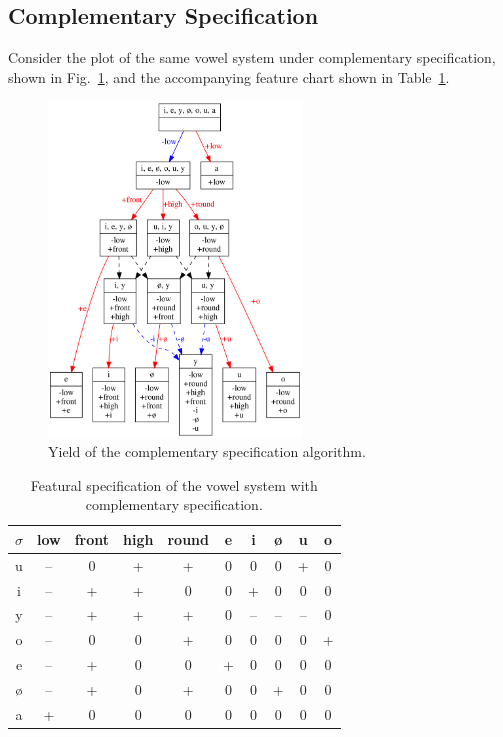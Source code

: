 \documentclass[12pt, oneside]{article}   	%
\begin{document}
\subsection{Complementary Specification}

Consider the plot of the same vowel system under complementary specification, shown in Fig.~\ref{fig:vowel_inventory_complementary}, and the accompanying feature chart shown in Table~\ref{table:vowel_inventory_complementary}.

\begin{figure}[htb!]
	\centering
	\includegraphics[width=0.6\textwidth]{vowel_inventory_complementary.png}
	\caption{Yield of the complementary specification algorithm.}
	\label{fig:vowel_inventory_complementary}
\end{figure}

\begin{table}[htb!]
	\centering
	\begin{tabular} {|c||c|c|c|c|c|c|c|c|c|}
		\hline
		$\sigma$ & low & front & high & round & e & i & \o & u & o \\ \hline
		u & -- & 0 & + & + & 0 & 0 & 0 & + & 0 \\
		i & -- & + & + & 0 & 0 & + & 0 & 0 & 0 \\
		y & -- & + & + & + & 0 & -- & -- & -- & 0 \\
		o & -- & 0 & 0 & + & 0 & 0 & 0 & 0 & + \\
		e & -- & + & 0 & 0 & + & 0 & 0 & 0 & 0 \\
		\o & -- & + & 0 & + & 0 & 0 & + & 0 & 0 \\
		a & + & 0 & 0 & 0 & 0 & 0 & 0 & 0 & 0 \\
		\hline
	\end{tabular}
	\caption{Featural specification of the vowel system with complementary specification.}
	\label{table:vowel_inventory_complementary}
\end{table}
\end{document}
